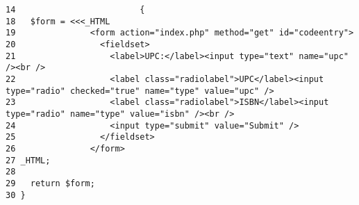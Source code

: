 \begin{Code}\begin{verbatim}14                         {
18   $form = <<<_HTML
19               <form action="index.php" method="get" id="codeentry">
20                 <fieldset>
21                   <label>UPC:</label><input type="text" name="upc" /><br />
22                   <label class="radiolabel">UPC</label><input type="radio" checked="true" name="type" value="upc" />
23                   <label class="radiolabel">ISBN</label><input type="radio" name="type" value="isbn" /><br />
24                   <input type="submit" value="Submit" />
25                 </fieldset>
26               </form>
27 _HTML;
28 
29   return $form;
30 }\end{verbatim}
\end{Code}


